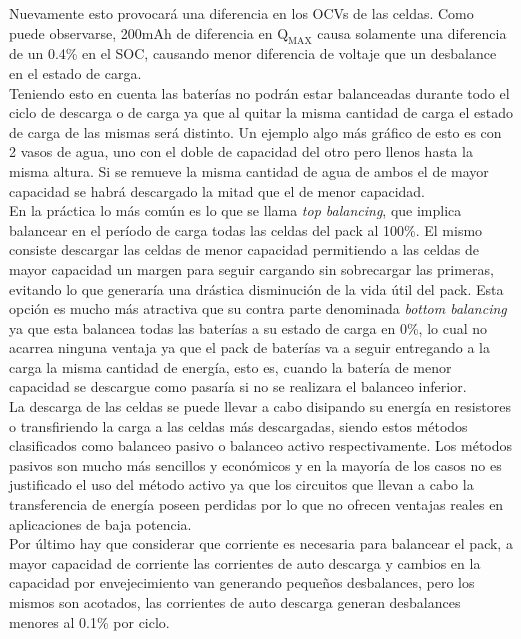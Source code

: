 \documentclass[10pt,a4paper]{article}
\begin{document}
	
	Nuevamente esto provocará una diferencia en los OCVs de las celdas. Como puede observarse, 200mAh de diferencia en $\mathrm{Q_{MAX}}$ causa solamente una diferencia de un 0.4\% en el SOC, causando menor diferencia de voltaje que un desbalance en el estado de carga.\\
	
	Teniendo esto en cuenta las baterías no podrán estar balanceadas durante todo el ciclo de descarga o de carga ya que al quitar la misma cantidad de carga el estado de carga de las mismas será distinto. Un ejemplo algo más gráfico de esto es con 2 vasos de agua, uno con el doble de capacidad del otro pero llenos hasta la misma altura. Si se remueve la misma cantidad de agua de ambos el de mayor  capacidad se habrá descargado la mitad que el de menor capacidad.\\
	
	En la práctica lo más común es lo que se llama \emph{top balancing}, que implica balancear en el período de carga todas las celdas del pack al 100\%. El mismo consiste descargar las celdas de menor capacidad permitiendo a las celdas de mayor capacidad un margen para seguir cargando sin sobrecargar las primeras, evitando lo que generaría una drástica disminución de la vida útil del pack. Esta opción es mucho más atractiva que su contra parte denominada \emph{bottom balancing} ya que esta balancea todas las baterías a su estado de carga en 0\%, lo cual no acarrea ninguna ventaja ya que el pack de baterías va a seguir entregando a la carga la misma cantidad de energía, esto es, cuando la batería de menor capacidad se descargue como pasaría si no se realizara el balanceo inferior.\\
	
	
	La descarga de las celdas se puede llevar a cabo disipando su energía en resistores o transfiriendo la carga a las celdas más descargadas, siendo estos métodos clasificados como balanceo pasivo o balanceo activo respectivamente. Los métodos pasivos son mucho más sencillos y económicos y en la mayoría de los casos no es justificado el uso del método activo ya que los circuitos que llevan a cabo la transferencia de energía poseen perdidas por lo que no ofrecen ventajas reales en aplicaciones de baja potencia.\\
	
	Por último hay que considerar que corriente es necesaria para balancear el pack, a mayor capacidad de corriente las corrientes de auto descarga y cambios en la capacidad por envejecimiento van generando pequeños desbalances, pero los mismos son acotados, las corrientes de auto descarga generan desbalances menores al 0.1\% por ciclo. 
	
\end{document}
